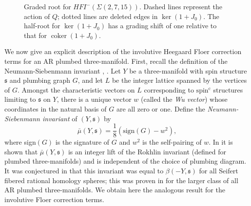 \documentclass[11 pt]{amsart}
\theoremstyle{remark}
\DeclareMathOperator{\coker}{coker}
\def\spinc {{\operatorname{spin^c}}}
\def\s{\mathfrak s}
\def\ker {{\operatorname{ker}}}
\def\HFI {\mathit{HFI}}
\newcommand \HFIm {\HFI^-}
\begin{document}
\begin{figure}[h!]
\caption{Graded root for $\HFIm(\Sigma(2, 7, 15))$. Dashed lines represent the action of $Q$; dotted lines are deleted edges in $\ker (1 + J_0)$. The half-root for $\ker (1 + J_0)$ has a grading shift of one relative to that for $\coker (1 + J_0)$.}
\label{fighfi}
\end{figure}

We now give an explicit description of the involutive Heegaard Floer correction terms for an AR plumbed three-manifold. First, recall the definition of the Neumann-Siebenmann invariant \cite{Neu}, \cite{Sieb}. Let $Y$ be a three-manifold with spin structure $\s$ and plumbing graph $G$, and let $L$ be the integer lattice spanned by the vertices of $G$. Amongst the characteristic vectors on $L$ corresponding to $\spinc$ structures limiting to $\s$ on $Y$, there is a unique vector $w$ (called the \textit{Wu vector}) whose coordinates in the natural basis of $G$ are all zero or one. Define the \textit{Neumann-Siebenmann invariant} of $(Y, \s)$ by
\[
\bar{\mu}(Y, \s) = \dfrac{1}{8}\left(\text{sign}(G) - w^2 \right),
\]
where sign$(G)$ is the signature of $G$ and $w^2$ is the self-pairing of $w$. In \cite{Neu} it is shown that $\bar{\mu}(Y, \s)$ is an integer lift of the Rokhlin invariant (defined for plumbed three-manifolds) and is independent of the choice of plumbing diagram. It was conjectured in \cite{Triangulations} that this invariant was equal to $\beta(-Y, \s)$ for all Seifert fibered rational homology spheres; this was proven in \cite{Dai} for the larger class of all AR plumbed three-manifolds. We obtain here the analogous result for the involutive Floer correction terms. 
\end{document}

